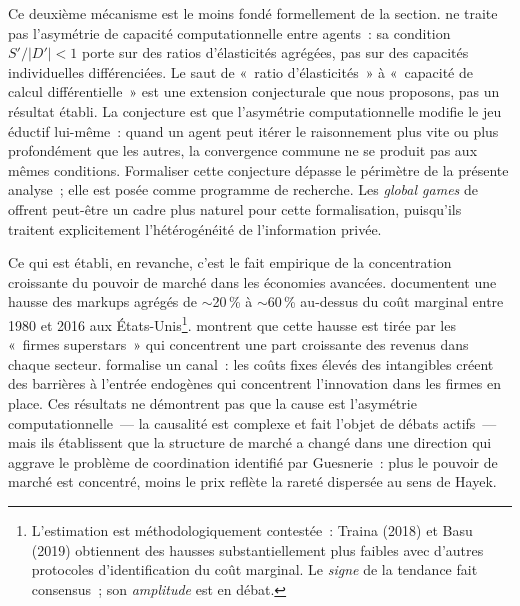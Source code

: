 Ce deuxième mécanisme est le moins fondé formellement de la section. \textcite{guesnerie_eductive_1992} ne traite pas l'asymétrie de capacité computationnelle entre agents~: sa condition $S'/|D'|<1$ porte sur des ratios d'élasticités agrégées, pas sur des capacités individuelles différenciées. Le saut de «~ratio d'élasticités~» à «~capacité de calcul différentielle~» est une extension conjecturale que nous proposons, pas un résultat établi. La conjecture est que l'asymétrie computationnelle modifie le jeu éductif lui-même~: quand un agent peut itérer le raisonnement plus vite ou plus profondément que les autres, la convergence commune ne se produit pas aux mêmes conditions. Formaliser cette conjecture dépasse le périmètre de la présente analyse~; elle est posée comme programme de recherche. Les \emph{global games} de \textcite{morris_shin_1998,morris_shin_2003} offrent peut-être un cadre plus naturel pour cette formalisation, puisqu'ils traitent explicitement l'hétérogénéité de l'information privée.

Ce qui est établi, en revanche, c'est le fait empirique de la concentration croissante du pouvoir de marché dans les économies avancées. \textcite{deloecker_rise_2020} documentent une hausse des markups agrégés de $\sim$20\,\% à $\sim$60\,\% au-dessus du coût marginal entre 1980 et 2016 aux États-Unis\footnote{L'estimation est méthodologiquement contestée~: Traina (2018) et Basu (2019) obtiennent des hausses substantiellement plus faibles avec d'autres protocoles d'identification du coût marginal. Le \emph{signe} de la tendance fait consensus~; son \emph{amplitude} est en débat.}. \textcite{autor_fall_2020} montrent que cette hausse est tirée par les «~firmes superstars~» qui concentrent une part croissante des revenus dans chaque secteur. \textcite{de_ridder_2024} formalise un canal~: les coûts fixes élevés des intangibles créent des barrières à l'entrée endogènes qui concentrent l'innovation dans les firmes en place. Ces résultats ne démontrent pas que la cause est l'asymétrie computationnelle~--- la causalité est complexe et fait l'objet de débats actifs~--- mais ils établissent que la structure de marché a changé dans une direction qui aggrave le problème de coordination identifié par Guesnerie~: plus le pouvoir de marché est concentré, moins le prix reflète la rareté dispersée au sens de Hayek.

